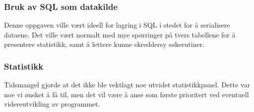 \subsubsection{Bruk av SQL som datakilde}
Denne oppgaven ville vært ideell for lagring i SQL i stedet for å serialisere dataene. Det ville vært normalt med mye spørringer på tvers tabellene for å presentere statistikk, samt å lettere kunne skreddersy søkerutiner.

\subsubsection{Statistikk}
Tidsmangel gjorde at det ikke ble vektlagt noe utvidet statistikkpanel. Dette var noe vi ønsket å få til, men det vil være å anse som første prioritert ved eventuell videreutvikling av programmet.